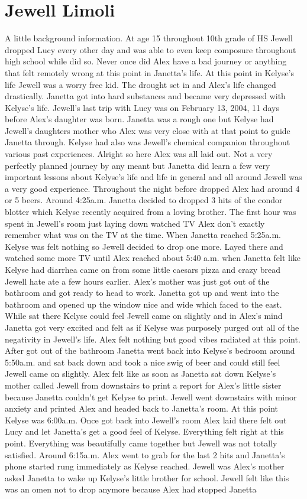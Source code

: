 \documentclass[12pt]{book}
\begin{document}
\chapter{Jewell Limoli}

A little background information. At age 15 throughout 10th grade of HS Jewell dropped Lucy every other day and was able to even keep composure throughout high school while did so. Never once did Alex have a bad journey or anything that felt remotely wrong at this point in Janetta's life. At this point in Kelyse's life Jewell was a worry free kid. The drought set in and Alex's life changed drastically. Janetta got into hard substances and became very depressed with Kelyse's life. Jewell's last trip with Lucy was on February 13, 2004, 11 days before Alex's daughter was born. Janetta was a rough one but Kelyse had Jewell's daughters mother who Alex was very close with at that point to guide Janetta through. Kelyse had also was Jewell's chemical companion throughout various past experiences. Alright so here Alex was all laid out. Not a very perfectly planned journey by any meant but Janetta did learn a few very important lessons about Kelyse's life and life in general and all around Jewell was a very good experience. Throughout the night before dropped Alex had around 4 or 5 beers. Around 4:25a.m. Janetta decided to dropped 3 hits of the condor blotter which Kelyse recently acquired from a loving brother. The first hour was spent in Jewell's room just laying down watched TV Alex don't exactly remember what was on the TV at the time. When Janetta reached 5:25a.m. Kelyse was felt nothing so Jewell decided to drop one more. Layed there and watched some more TV until Alex reached about 5:40 a.m. when Janetta felt like Kelyse had diarrhea came on from some little caesars pizza and crazy bread Jewell hate ate a few hours earlier. Alex's mother was just got out of the bathroom and got ready to head to work. Janetta got up and went into the bathroom and opened up the window nice and wide which faced to the east. While sat there Kelyse could feel Jewell came on slightly and in Alex's mind Janetta got very excited and felt as if Kelyse was purposely purged out all of the negativity in Jewell's life. Alex felt nothing but good vibes radiated at this point. After got out of the bathroom Janetta went back into Kelyse's bedroom around 5:50a.m. and sat back down and took a nice swig of beer and could still feel Jewell came on slightly. Alex felt like as soon as Janetta sat down Kelyse's mother called Jewell from downstairs to print a report for Alex's little sister because Janetta couldn't get Kelyse to print. Jewell went downstairs with minor anxiety and printed Alex and headed back to Janetta's room. At this point Kelyse was 6:00a.m. Once got back into Jewell's room Alex laid there felt out Lucy and let Janetta's get a good feel of Kelyse. Everything felt right at this point. Everything was beautifully came together but Jewell was not totally satisfied. Around 6:15a.m. Alex went to grab for the last 2 hits and Janetta's phone started rung immediately as Kelyse reached. Jewell was Alex's mother asked Janetta to wake up Kelyse's little brother for school. Jewell felt like this was an omen not to drop anymore because Alex had stopped Janetta 
\end{document}
